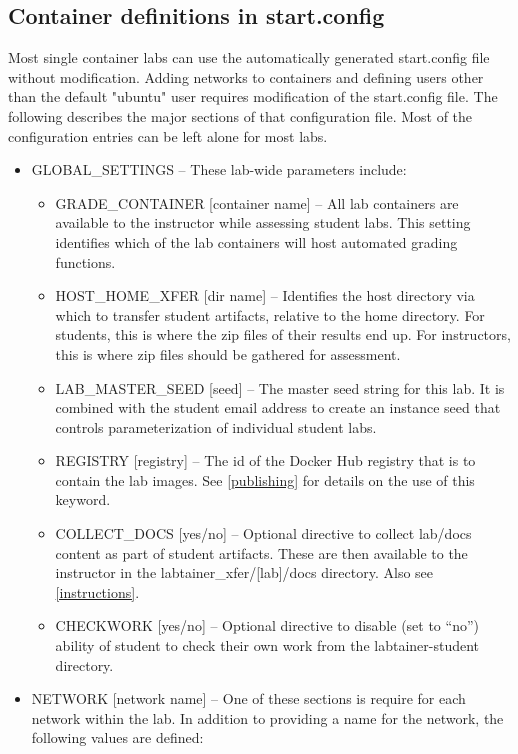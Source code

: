 \documentclass[12pt]{article}
\begin{document}
\subsection{Container definitions in start.config}
\label{start config}
Most single container labs can use the automatically generated start.config file
without modification.  Adding networks to containers and defining users other than the
default "ubuntu" user requires modification of the start.config file.
The following describes the major sections of that configuration file.  Most of the configuration
entries can be left alone for most labs.
\begin{itemize}
\item GLOBAL\_SETTINGS -- These lab-wide parameters include:

\begin{itemize}
\item GRADE\_CONTAINER [container name] -- All lab containers are available to the instructor while assessing student labs.
This setting identifies which of the lab containers will host automated grading functions.
\item HOST\_HOME\_XFER [dir name] --  Identifies the host directory via which to transfer student artifacts, relative to 
the home directory.  For students, this is where the zip files of their results end up.  For instructors, this is
where zip files should be gathered for assessment.
\item LAB\_MASTER\_SEED [seed] -- The master seed string for this lab.  It is combined with the student email
address to create an instance seed that controls parameterization of individual student labs.
\item REGISTRY [registry] -- The id of the Docker Hub registry that is to contain the lab images.
See \ref{publishing} for details on the use of this keyword.
\item COLLECT\_DOCS [yes/no] -- Optional directive to collect lab/docs content as part of student artifacts.
These are then available to the instructor in the labtainer\_xfer/[lab]/docs directory.  Also see \ref{instructions}.
\item CHECKWORK [yes/no] -- Optional directive to disable (set to ``no'') ability of student to check their own work from the labtainer-student directory.
\end{itemize}

\item NETWORK [network name] -- One of these sections is require for each network within the lab.  In addition to
providing a name for the network, the following values are defined:


\end{itemize}
\end{document}
